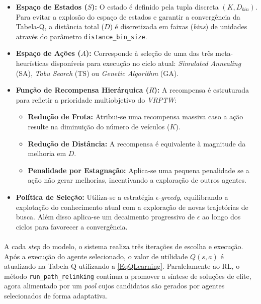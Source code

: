 \begin{itemize}
    \item \textbf{Espaço de Estados ($S$):} O estado é definido pela tupla discreta $(K, D_{bin})$. Para evitar a explosão do espaço de estados e garantir a convergência da Tabela-Q, a distância total ($D$) é discretizada em faixas (\textit{bins}) de unidades através do parâmetro \texttt{distance\_bin\_size}.
    \item \textbf{Espaço de Ações ($A$):} Corresponde à seleção de uma das três meta-heurísticas disponíveis para execução no ciclo atual: \textit{Simulated Annealing} (SA), \textit{Tabu Search} (TS) ou \textit{Genetic Algorithm} (GA).
    \item \textbf{Função de Recompensa Hierárquica ($R$):} A recompensa é estruturada para refletir a prioridade multiobjetivo do \textit{VRPTW}:
    \begin{itemize}
        \item \textbf{Redução de Frota:} Atribui-se uma recompensa massiva caso a ação resulte na diminuição do número de veículos ($K$).
        \item \textbf{Redução de Distância:} A recompensa é equivalente à magnitude da melhoria em $D$.
        \item \textbf{Penalidade por Estagnação:} Aplica-se uma pequena penalidade se a ação não gerar melhorias, incentivando a exploração de outros agentes.
    \end{itemize}
    \item \textbf{Política de Seleção:} Utiliza-se a estratégia $\epsilon$-\textit{greedy}, equilibrando a explotação do conhecimento atual com a exploração de novas trajetórias de busca. Além disso aplica-se um decaimento progressivo de $\epsilon$ ao longo dos ciclos para favorecer a convergência.
\end{itemize}



\paragraph{} A cada \textit{step} do modelo, o sistema realiza três iterações de escolha e execução. Após a execução do agente selecionado, o valor de utilidade $Q(s, a)$ é atualizado na Tabela-Q utilizando a \autoref{EqQLearning}. Paralelamente ao RL, o método \texttt{run\_path\_relinking} continua a promover a síntese de soluções de elite, agora alimentado por um \textit{pool} cujos candidatos são gerados por agentes selecionados de forma adaptativa.


